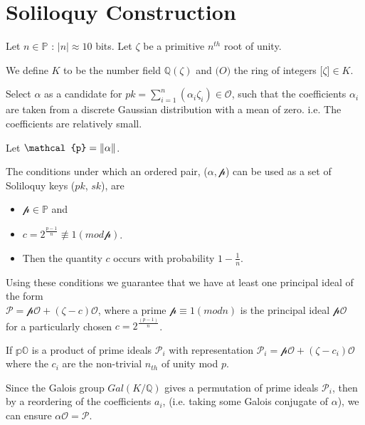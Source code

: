 \section{Soliloquy Construction}

Let $n \in \mathbb{P}$ : $|n| \approx 10$ bits.
Let $\zeta$ be a primitive $n^{th}$ root of unity.

We define $K$ to be the number field $\mathbb{Q}(\zeta)$ and $\mathcal(O)$ the ring of integers $\mathbb[\zeta] \in K$. 

Select $\alpha$ as a candidate for $pk = \sum_{i=1}^{n} (\alpha_{i} \zeta_{i}) \in \mathcal{O}$, such that the coefficients $\alpha_{i}$ are taken from a discrete Gaussian distribution with a mean of zero.  
i.e. The coefficients are relatively small. 

Let $\mathcal{p}=\norm{\alpha}$.

The conditions under which an ordered pair, ($\alpha, \mathcal{p}$) can be used as a set of Soliloquy keys ($pk$, $sk$), are 
\begin{itemize}
\item $\mathcal{p} \in \mathbb{P}$  and 
\item $c=2^{\frac{p-1}{n}} \not\equiv 1(mod \mathcal{p})$.
\item Then the quantity $c$ occurs with probability $1-\frac{1}{n}$. 
\end{itemize}

Using these conditions we guarantee that we have at least one principal ideal of the form \\ $\mathcal{P} = \mathcal{pO}+(\zeta-c)\mathcal{O}$, where a prime $\mathcal{p} \equiv 1(mod n)$ is the principal ideal $\mathcal{pO}$ \\ for a particularly chosen $c=2^{\frac{(p-1)}{n}}$. 

If $\mathbb{pO}$ is a product of prime ideals $\mathcal{P}_{i}$ with representation $\mathcal{P}_{i} = \mathcal{pO} + (\zeta-c_{i}) \mathcal{O}$ where the $c_{i}$ are the non-trivial $n_{th}$ of unity mod $p$. 

Since the Galois group $Gal(K/\mathbb{Q})$ gives a permutation of prime ideals $\mathcal{P}_{i}$, then by a reordering of the coefficients $a_{i}$, (i.e. taking some Galois conjugate of $\alpha$), we can ensure $\alpha \mathcal{O} = \mathcal{P}$. 

